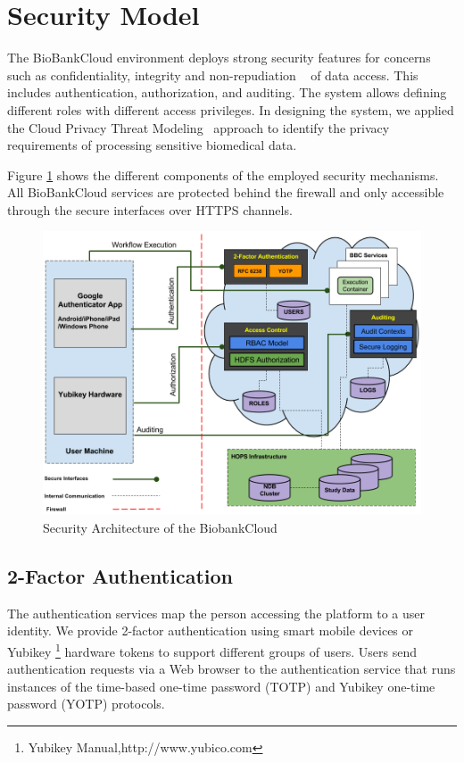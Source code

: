 \section{Security Model}

The BioBankCloud environment deploys strong security features for concerns such as confidentiality, integrity and non-repudiation ~\cite{BBCSEC} of data access. This includes authentication, authorization, and auditing. The system allows defining different roles with different access privileges. In designing the system, we applied the Cloud Privacy Threat Modeling~\cite {CPTM} approach to identify the privacy requirements of processing sensitive biomedical data.


Figure \ref{fig:security} shows the different components of the employed security mechanisms. All BioBankCloud services are protected behind the firewall and only accessible through the secure interfaces over HTTPS channels.


\begin{figure}[h]
\centering
\includegraphics[width=\textwidth]{./imgs/security.png}
\caption{Security Architecture of the BiobankCloud}
\label{fig:security}
\end{figure}


\subsection{2-Factor Authentication}
The authentication services map the person accessing the platform to a user identity. We provide 2-factor authentication using smart mobile devices or Yubikey \footnote {Yubikey Manual,http://www.yubico.com} hardware tokens to support different groups of users. Users send authentication requests via a Web browser to the authentication service that runs instances of the time-based one-time password (TOTP) and Yubikey one-time password (YOTP) protocols.


